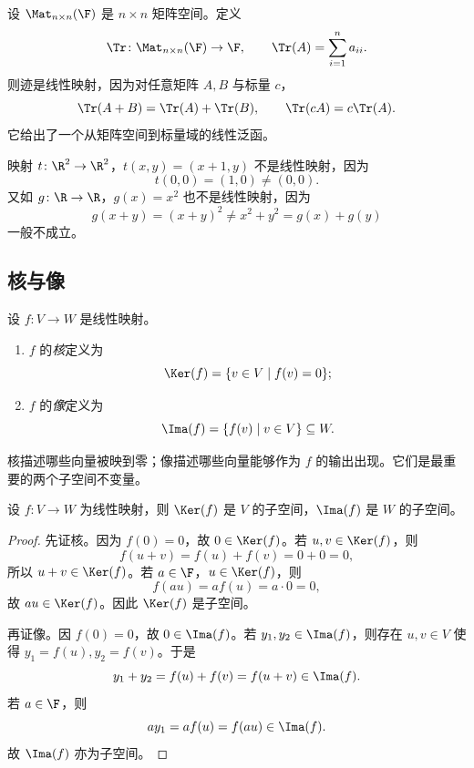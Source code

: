 \begin{example}[迹映射]
设 $\Mat_{n\times n}(\F)$ 是 $n\times n$ 矩阵空间。定义
\[
  \Tr\colon \Mat_{n\times n}(\F)\to \F,
  \qquad
  \Tr(A)=\sum_{i=1}^n a_{ii}.
\]
则迹是线性映射，因为对任意矩阵 $A,B$ 与标量 $c$，
\[
  \Tr(A+B)=\Tr(A)+\Tr(B),\qquad \Tr(cA)=c\Tr(A).
\]
它给出了一个从矩阵空间到标量域的线性泛函。
\end{example}

\begin{example}[不是线性映射的例子]
映射 $t\colon \R^2\to\R^2$，$t(x,y)=(x+1,y)$ 不是线性映射，因为
\[
  t(0,0)=(1,0)\neq (0,0).
\]
又如 $g\colon \R\to\R$，$g(x)=x^2$ 也不是线性映射，因为
\[
  g(x+y)=(x+y)^2\neq x^2+y^2=g(x)+g(y)
\]
一般不成立。
\end{example}

\subsection{核与像}

\begin{definition}
设 $f\colon V\to W$ 是线性映射。
\begin{enumerate}[label=\textnormal{(\arabic*)}]
  \item $f$ 的\emph{核}定义为
  \[
    \Ker(f)=\{v\in V\mid f(v)=0\};
  \]
  \item $f$ 的\emph{像}定义为
  \[
    \Ima(f)=\{f(v)\mid v\in V\}\subseteq W.
  \]
\end{enumerate}
\end{definition}

核描述哪些向量被映到零；像描述哪些向量能够作为 $f$ 的输出出现。它们是最重要的两个子空间不变量。

\begin{proposition}
设 $f\colon V\to W$ 为线性映射，则 $\Ker(f)$ 是 $V$ 的子空间，$\Ima(f)$ 是 $W$ 的子空间。
\end{proposition}

\begin{proof}
先证核。因为 $f(0)=0$，故 $0\in\Ker(f)$。若 $u,v\in\Ker(f)$，则
\[
  f(u+v)=f(u)+f(v)=0+0=0,
\]
所以 $u+v\in\Ker(f)$。若 $a\in\F$，$u\in\Ker(f)$，则
\[
  f(au)=af(u)=a\cdot 0=0,
\]
故 $au\in\Ker(f)$。因此 $\Ker(f)$ 是子空间。

再证像。因 $f(0)=0$，故 $0\in\Ima(f)$。若 $y_1,y_2\in\Ima(f)$，则存在 $u,v\in V$ 使得 $y_1=f(u),y_2=f(v)$。于是
\[
  y_1+y_2=f(u)+f(v)=f(u+v)\in\Ima(f).
\]
若 $a\in\F$，则
\[
  ay_1=af(u)=f(au)\in\Ima(f).
\]
故 $\Ima(f)$ 亦为子空间。
\end{proof}


